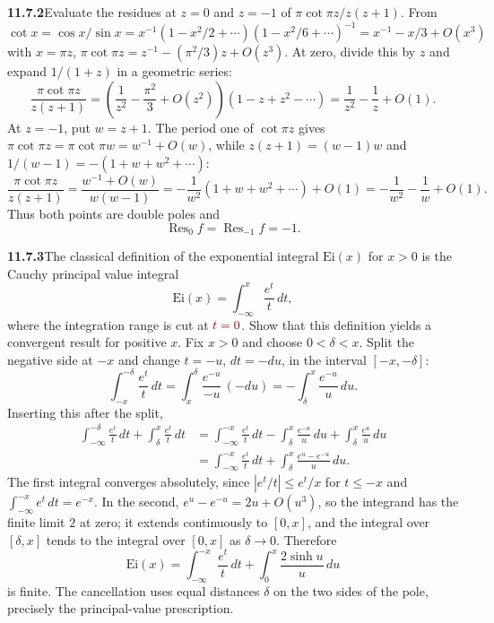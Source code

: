 \par\bigskip
\noindent\textbf{11.7.2}\quad Evaluate the residues at $z=0$ and $z=-1$ of
$\pi\cot\pi z/z(z+1)$.
\solution
From $\cot x=\cos x/\sin x=x^{-1}(1-x^2/2+\cdots)(1-x^2/6+\cdots)^{-1}
=x^{-1}-x/3+O(x^3)$ with $x=\pi z$,
$\pi\cot\pi z=z^{-1}-(\pi^2/3)z+O(z^3)$. At zero, divide this by $z$
and expand $1/(1+z)$ in a geometric series:
\[
\frac{\pi\cot\pi z}{z(z+1)}
=\left(\frac1{z^2}-\frac{\pi^2}{3}+O(z^2)\right)
(1-z+z^2-\cdots)
=\frac1{z^2}-\frac1z+O(1).
\]
At $z=-1$, put $w=z+1$. The period one of $\cot\pi z$ gives
$\pi\cot\pi z=\pi\cot\pi w=w^{-1}+O(w)$, while $z(z+1)=(w-1)w$ and
$1/(w-1)=-(1+w+w^2+\cdots)$:
\[
\frac{\pi\cot\pi z}{z(z+1)}
=\frac{w^{-1}+O(w)}{w(w-1)}
=-\frac1{w^2}(1+w+w^2+\cdots)+O(1)
=-\frac1{w^2}-\frac1w+O(1).
\]
Thus both points are double poles and
\[
\boxed{\operatorname{Res}_{0}f=\operatorname{Res}_{-1}f=-1}.
\]

\par\bigskip
\noindent\textbf{11.7.3}\quad The classical definition of the exponential
integral $\mathrm{Ei}(x)$ for $x>0$ is the Cauchy principal value integral
\[
\mathrm{Ei}(x)=\int_{-\infty}^{x}\frac{e^{t}}{t}\,dt,
\]
where the integration range is cut at $\erratum{t=0}$. Show that this definition yields
a convergent result for positive $x$.
\solution
{}
Fix $x>0$ and choose $0<\delta<x$. Split the negative side at $-x$
and change $t=-u$, $dt=-du$, in the interval $[-x,-\delta]$:
\[
\int_{-x}^{-\delta}\frac{e^t}{t}\,dt
=\int_{x}^{\delta}\frac{e^{-u}}{-u}\,(-du)
=-\int_\delta^x\frac{e^{-u}}u\,du.
\]
Inserting this after the split,
\[
\begin{aligned}
\int_{-\infty}^{-\delta}\frac{e^t}{t}\,dt+
\int_\delta^x\frac{e^t}{t}\,dt
&=\int_{-\infty}^{-x}\frac{e^t}{t}\,dt
-\int_\delta^x\frac{e^{-u}}u\,du
+\int_\delta^x\frac{e^u}u\,du\\
&=\int_{-\infty}^{-x}\frac{e^t}{t}\,dt
+\int_\delta^x\frac{e^u-e^{-u}}u\,du.
\end{aligned}
\]
The first integral converges absolutely, since $|e^t/t|\le e^t/x$ for
$t\le-x$ and $\int_{-\infty}^{-x}e^t\,dt=e^{-x}$. In the second,
$e^u-e^{-u}=2u+O(u^3)$, so the integrand has the finite limit $2$ at
zero; it extends continuously to $[0,x]$, and the integral over
$[\delta,x]$ tends to the integral over $[0,x]$ as $\delta\to0$.
Therefore
\[
\boxed{\mathrm{Ei}(x)=
\int_{-\infty}^{-x}\frac{e^t}{t}\,dt+
\int_0^x\frac{2\sinh u}{u}\,du}
\]
is finite. The cancellation uses equal distances $\delta$ on the two
sides of the pole, precisely the principal-value prescription.

